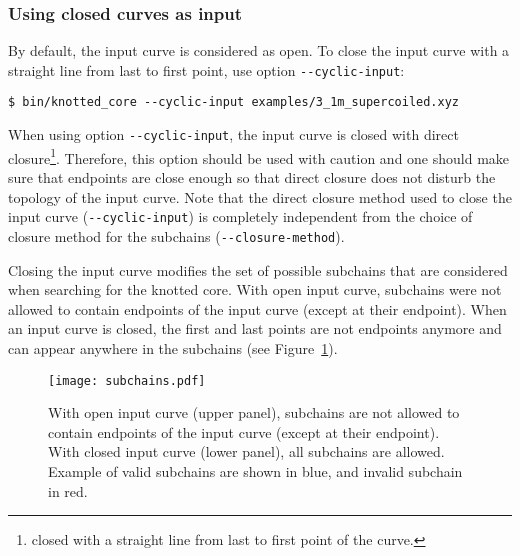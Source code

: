 \subsubsection{Using closed curves as input}
By default, the input curve is considered as open. To close the input curve with a straight line from last to first point, use option \lstinline{--cyclic-input}:
\begin{lstlisting}
$ bin/knotted_core --cyclic-input examples/3_1m_supercoiled.xyz
\end{lstlisting}
When using option \lstinline{--cyclic-input}, the input curve is closed with direct closure\footnote{closed with a straight line from last to first point of the curve.}. Therefore, this option should be used with caution and one should make sure that endpoints are close enough so that direct closure does not disturb the topology of the input curve. Note that the direct closure method used to close the input curve (\lstinline{--cyclic-input}) is completely independent from the choice of closure method for the subchains (\lstinline{--closure-method}).

Closing the input curve modifies the set of possible subchains that are considered when searching for the knotted core.
With open input curve, subchains were not allowed to contain endpoints of the input curve (except at their endpoint).
When an input curve is closed, the first and last points are not endpoints anymore and can appear anywhere in the subchains (see Figure~\ref{fig:subchains}).
\begin{figure}[t]
\centering
\texttt{[image: subchains.pdf]}
\caption{With open input curve (upper panel), subchains are not allowed to contain endpoints of the input curve (except at their endpoint). With closed input curve (lower panel), all subchains are allowed. Example of valid subchains are shown in blue, and invalid subchain in red. }\label{fig:subchains}
\end{figure}

